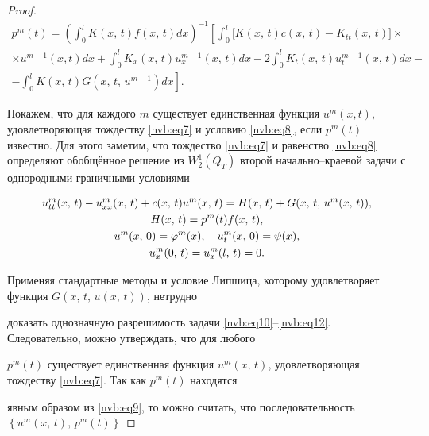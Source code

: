 \begin{proof}
\begin{multline}
    p^m(t)=\left( \int _0^l K(x,\,t) f(x,\,t) dx\right)^{-1}\left[ \int _0^l\bigl[K(x,\,t)c(x,\,t)-K_{tt}(x,\,t) \bigr] \times \right. \\ \times u^{m-1}(x,t)      dx

    + \int _0^l K_x(x,\,t) u_x^{m-1}(x,\,t)dx - 2\int _0^l K_t(x,\,t) u_t^{m-1}(x,\,t) dx - \\

    \left.-\int _0^l K(x,\,t) G(x,\,t,\,u^{m-1})dx\right].

      \end{multline}



Покажем, что для каждого $m$ существует единственная функция $u^m(x,t)$, удовлетворяющая тождеству \eqref{nvb:eq7} и условию \eqref{nvb:eq8}, если  $ p^m(t)$ известно. Для этого заметим, что тождество  \eqref{nvb:eq7}  и равенство \eqref{nvb:eq8} определяют обобщённое решение из $W_2^1(Q_T)$ второй начально--краевой задачи с однородными граничными условиями

      \begin{gather}

      \label{nvb:eq10}

      u^m_{tt}(x,\,t)-u^m_{xx}(x,\,t)+c(x,\,t)u^m(x,\,t)=H(x,\,t)+G(x,\,t,\,u^m(x,\,t)),\\

      \notag

      H(x,\,t)=p^m(t)f(x,\,t),\\

      \label{nvb:eq11}

      u^m(x,\,0)=\varphi^m(x), \quad u^m_t(x,\,0)=\psi(x),\\

       \label{nvb:eq12}

       u^m_x(0,\,t)=u^m_x(l,\,t)=0.

      \end{gather}



Применяя стандартные методы \cite{lad} и условие Липшица, которому удовлетворяет функция $ G(x,\,t,\,u(x,\,t))$, нетрудно

доказать однозначную разрешимость задачи \eqref{nvb:eq10}--\eqref{nvb:eq12}. Следовательно, можно утверждать, что для любого

$p^m(t)$ существует единственная функция $u^m(x,\,t)$, удовлетворяющая тождеству \eqref{nvb:eq7}. Так как $ p^m(t)$ находятся

явным образом из \eqref{nvb:eq9}, то можно считать, что последовательность $\left\lbrace u^m(x,\,t),\,p^m(t)\right\rbrace $


\end{proof}
